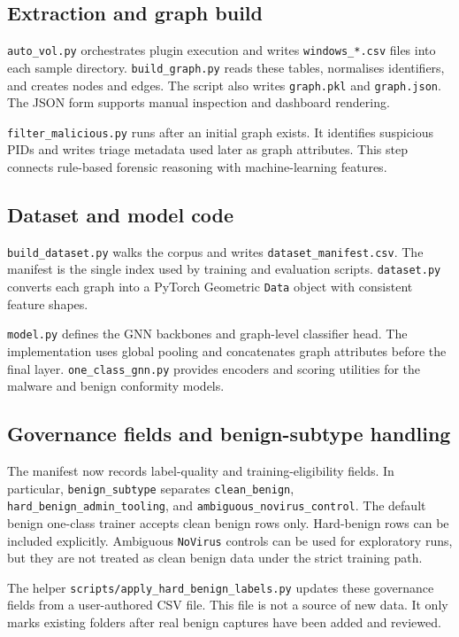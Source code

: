 \subsection{Extraction and graph build}

\texttt{auto\_vol.py} orchestrates plugin execution and writes \texttt{windows\_*.csv} files into each sample directory. \texttt{build\_graph.py} reads these tables, normalises identifiers, and creates nodes and edges. The script also writes \texttt{graph.pkl} and \texttt{graph.json}. The JSON form supports manual inspection and dashboard rendering.

\texttt{filter\_malicious.py} runs after an initial graph exists. It identifies suspicious PIDs and writes triage metadata used later as graph attributes. This step connects rule-based forensic reasoning with machine-learning features.

\subsection{Dataset and model code}

\texttt{build\_dataset.py} walks the corpus and writes \texttt{dataset\_manifest.csv}. The manifest is the single index used by training and evaluation scripts. \texttt{dataset.py} converts each graph into a PyTorch Geometric \texttt{Data} object with consistent feature shapes.

\texttt{model.py} defines the GNN backbones and graph-level classifier head. The implementation uses global pooling and concatenates graph attributes before the final layer. \texttt{one\_class\_gnn.py} provides encoders and scoring utilities for the malware and benign conformity models.

\subsection{Governance fields and benign-subtype handling}

The manifest now records label-quality and training-eligibility fields. In particular, \texttt{benign\_subtype} separates \texttt{clean\_benign}, \texttt{hard\_benign\_admin\_tooling}, and \texttt{ambiguous\_novirus\_control}. The default benign one-class trainer accepts clean benign rows only. Hard-benign rows can be included explicitly. Ambiguous \texttt{NoVirus} controls can be used for exploratory runs, but they are not treated as clean benign data under the strict training path.

The helper \texttt{scripts/apply\_hard\_benign\_labels.py} updates these governance fields from a user-authored CSV file. This file is not a source of new data. It only marks existing folders after real benign captures have been added and reviewed.

